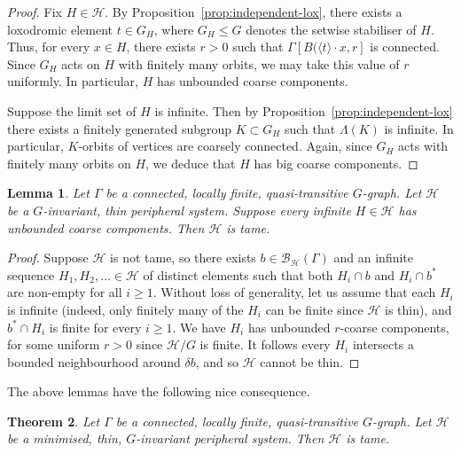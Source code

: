 \documentclass[11pt,a4paper]{amsart}
\newtheorem{theorem}{Theorem}[section]%
\newtheorem{lemma}[theorem]{Lemma}
\theoremstyle{definition}
\newcommand{\per}{\mathcal{H}}
\newcommand{\br}{{\mathscr{B}}}
\begin{document}
\begin{proof}
    Fix $H \in \per$. By Proposition~\ref{prop:independent-lox}, there exists a loxodromic element $t \in G_H$, where $G_H \leq G$ denotes the setwise stabiliser of $H$. Thus, for every $x \in H$, there exists $r > 0$ such that $\Gamma[B(\langle t\rangle \cdot x,r]$ is connected. Since $G_H$ acts on $H$ with finitely many orbits, we may take this value of $r$ uniformly. In particular, $H$ has unbounded coarse components. 

    Suppose the limit set of $H$ is infinite. Then by Proposition~\ref{prop:independent-lox} there exists a finitely generated subgroup $K \subset G_H$ such that $\Lambda(K)$ is infinite. In particular, $K$-orbits of vertices are coarsely connected. Again, since $G_H$ acts with finitely many orbits on $H$, we deduce that $H$ has big coarse components. 
\end{proof}

\begin{lemma}\label{lem:unbounded-components-tame}
    Let $\Gamma$ be a connected, locally finite, quasi-transitive $G$-graph. Let $\per$ be a $G$-invariant, thin peripheral system. Suppose every infinite $H \in \per$ has unbounded coarse components. Then $\per$ is tame. 
\end{lemma}

\begin{proof}
    Suppose $\per$ is not tame, so there exists $b \in \br_\per(\Gamma)$ and an infinite sequence $H_1, H_2 , \ldots \in \per$ of distinct elements such that both $H_i \cap b$ and $H_i \cap b^\ast$ are non-empty for all $i \geq 1$. Without loss of generality, let us assume that each $H_i$ is infinite (indeed, only finitely many of the $H_i$ can be finite since $\per$ is thin), and $b^\ast \cap H_i$ is finite for every $i \geq 1$. We have $H_i$ has unbounded $r$-coarse components, for some uniform $r > 0$ since $\per /G$ is finite. It follows every $H_i$ intersects a bounded neighbourhood around $\delta b$, and so $\per$ cannot be thin. 
\end{proof}

The above lemmas have the following nice consequence. 

\begin{theorem}\label{lem:thin-min-implies-tame}
    Let $\Gamma$ be a connected, locally finite, quasi-transitive $G$-graph. Let $\per$ be a minimised, thin, $G$-invariant peripheral system. Then $\per$ is tame.
\end{theorem}
\end{document}
